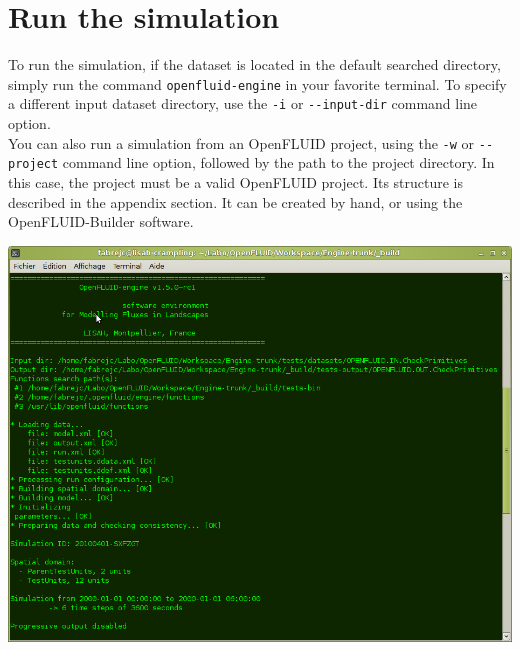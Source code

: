 \section{Run the simulation}

To run the simulation, if the dataset is located in the default searched directory, simply run the command \texttt{openfluid-engine} in your favorite terminal. 
To specify a different input dataset directory, use the \texttt{-i} or \verb?--?\texttt{input-dir} command line option.\\

You can also run a simulation from an OpenFLUID project, using the \texttt{-w} 
or \verb?--?\texttt{project} command line option, followed by the path to the project directory. 
In this case, the project must be a valid OpenFLUID project. Its structure is described in the appendix section.
It can be created by hand, or using the OpenFLUID-Builder software.\\



\bigskip

\begin{latexonly}
\begin{center}
\includegraphics[scale=0.4]{common/graphics/oferun.png}
\end{center}
\end{latexonly}

